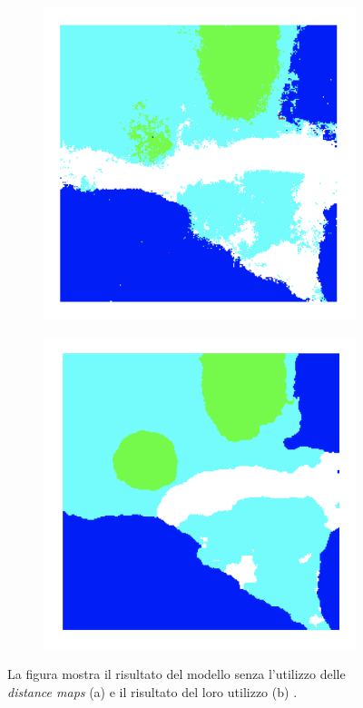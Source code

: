 \begin{figure}[h!]
     \centering
     \begin{subfigure}[b]{0.45\textwidth}
         \centering
         \includegraphics[width=\textwidth]{img/distance3.png}
         \caption{}
         \label{}
     \end{subfigure}
     \hfill
     \begin{subfigure}[b]{0.45\textwidth}
         \centering
         \includegraphics[width=\textwidth]{img/distance2.png}
         \caption{}
         \label{}
     \end{subfigure}
        \caption{La figura mostra il risultato del modello senza l'utilizzo delle \textit{distance maps} (a) e il risultato del loro utilizzo (b) \cite{distance_map}.}
        \label{fig:distance_map_result}
\end{figure}

